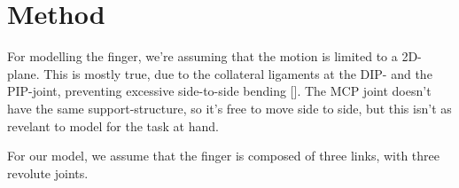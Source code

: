 \chapter{Method}%
\label{ch:method}
For modelling the finger, we're assuming that the motion is limited to a 2D-plane. This is mostly true, due to the collateral ligaments at the DIP- and the PIP-joint, preventing excessive side-to-side bending [\cite{TODO:Colateral ligaments}]. The MCP joint doesn't have the same support-structure, so it's free to move side to side, but this isn't as revelant to model for the task at hand.

For our model, we assume that the finger is composed of three links, with three revolute joints. 
